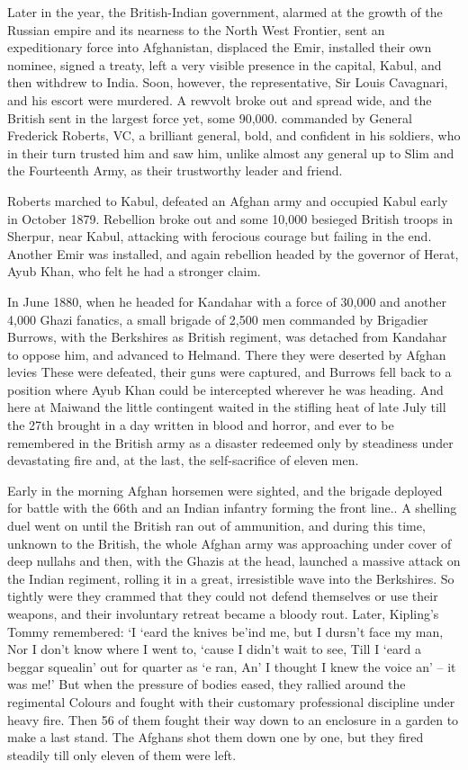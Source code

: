 Later in the year, the British-Indian government, alarmed at the growth of the Russian empire and its nearness to the North West Frontier, sent an expeditionary force into Afghanistan, displaced the Emir, installed their own nominee, signed a treaty, left a very visible presence in the capital, Kabul, and then withdrew to India. Soon, however, the representative, Sir Louis Cavagnari, and his escort were murdered. A rewvolt broke out and spread wide, and the British sent in the largest force yet, some 90,000. commanded by General Frederick Roberts, VC, a brilliant general, bold, and confident in his soldiers, who in their turn trusted him and saw him, unlike almost any general up to Slim and the Fourteenth Army, as their trustworthy leader and friend.

Roberts marched to Kabul, defeated an Afghan army and occupied Kabul early in October 1879. Rebellion broke out and some 10,000 besieged British troops in Sherpur, near Kabul, attacking with ferocious courage but failing in the end. Another Emir was installed, and again rebellion headed by the governor of Herat, Ayub Khan, who felt he had a stronger claim.

In June 1880, when he headed for Kandahar with a force of 30,000 and another 4,000 Ghazi fanatics, a small brigade of 2,500 men commanded by Brigadier Burrows, with the Berkshires as British regiment, was detached from Kandahar to oppose him, and advanced to Helmand. There they were deserted by Afghan levies These were defeated, their guns were captured, and Burrows fell back to a position where Ayub Khan could be intercepted wherever he was heading. And here at Maiwand the little contingent waited in the stifling heat of late July till the 27th brought in a day written in blood and horror, and ever to be remembered in the British army as a disaster redeemed only by steadiness under devastating fire and, at the last, the self-sacrifice of eleven men.

Early in the morning Afghan horsemen were sighted, and the brigade deployed for battle with the 66th and an Indian infantry forming the front line.. A shelling duel went on until the British ran out of ammunition, and during this time, unknown to the British, the whole Afghan army was approaching under cover of deep nullahs and then, with the Ghazis at the head, launched a massive attack on the Indian regiment, rolling it in a great, irresistible wave into the Berkshires. So tightly were they crammed that they could not defend themselves or use their weapons, and their involuntary retreat became a bloody rout. Later, Kipling’s Tommy remembered: ‘I ‘eard the knives be’ind me, but I dursn’t face my man, Nor I don’t know where I went to, ‘cause I didn’t wait to see, Till I ‘eard a beggar squealin’ out for quarter as ‘e ran, An’ I thought I knew the voice an’ – it was me!’ But when the pressure of bodies eased, they rallied around the regimental Colours and fought with their customary professional discipline under heavy fire. Then 56 of them fought their way down to an enclosure in a garden to make a last stand. The Afghans shot them down one by one, but they fired steadily till only eleven of them were left. 

